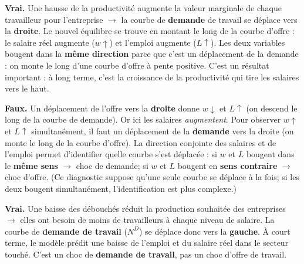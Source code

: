 

\begin{reponse}
\textbf{Vrai.} Une hausse de la productivité augmente la valeur marginale de chaque travailleur pour l'entreprise $\to$ la courbe de \textbf{demande} de travail se déplace vers la \textbf{droite}. Le nouvel équilibre se trouve en montant le long de la courbe d'offre : le salaire réel augmente ($w \uparrow$) et l'emploi augmente ($L \uparrow$). Les deux variables bougent dans la \textbf{même direction} parce que c'est un déplacement de la demande : on monte le long d'une courbe d'offre à pente positive. C'est un résultat important : à long terme, c'est la croissance de la productivité qui tire les salaires vers le haut.
\end{reponse}


\begin{reponse}
\textbf{Faux.} Un déplacement de l'offre vers la \textbf{droite} donne $w \downarrow$ et $L \uparrow$ (on descend le long de la courbe de demande). Or ici les salaires \textit{augmentent}. Pour observer $w \uparrow$ et $L \uparrow$ simultanément, il faut un déplacement de la \textbf{demande} vers la droite (on monte le long de la courbe d'offre). La direction conjointe des salaires et de l'emploi permet d'identifier quelle courbe s'est déplacée : si $w$ et $L$ bougent dans le \textbf{même sens} $\to$ choc de demande; si $w$ et $L$ bougent en \textbf{sens contraire} $\to$ choc d'offre. (Ce diagnostic suppose qu'une seule courbe se déplace à la fois; si les deux bougent simultanément, l'identification est plus complexe.)
\end{reponse}


\begin{reponse}
\textbf{Vrai.} Une baisse des débouchés réduit la production souhaitée des entreprises $\to$ elles ont besoin de moins de travailleurs à chaque niveau de salaire. La courbe de \textbf{demande de travail} ($N^D$) se déplace donc vers la \textbf{gauche}. À court terme, le modèle prédit une baisse de l'emploi et du salaire réel dans le secteur touché. C'est un choc de \textbf{demande de travail}, pas un choc d'offre de travail.
\end{reponse}

